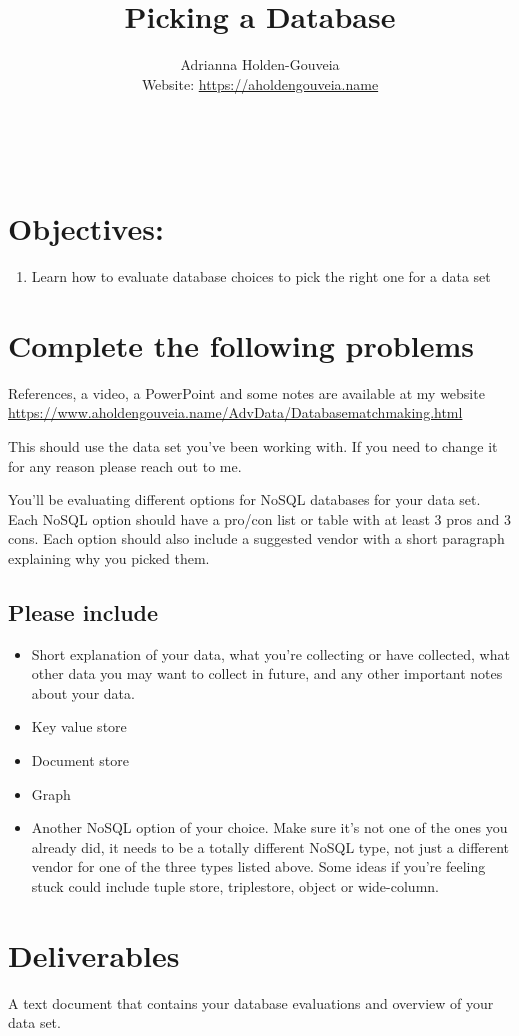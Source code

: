 \documentclass[12pt]{article}
\title{Picking a Database}
\author{
        Adrianna Holden-Gouveia \\
        Website: \url{https://aholdengouveia.name}\\ 
        \date{\vspace{-5ex}}
        \faLinkedin{: aholdengouveia} \\
        \faGithub {: aholdengouveia} \\
        }
\begin{document}
    

\maketitle


\section*{Objectives:}
\begin{enumerate}
    \item Learn how to evaluate database choices to pick the right one for a data set
\end{enumerate}
\section*{Complete the following problems}

References, a video, a PowerPoint and some notes are available at my website
\url {https://www.aholdengouveia.name/AdvData/Databasematchmaking.html}

This should use the data set you've been working with.  If you need to change it for any reason please reach out to me.

You'll be evaluating different options for NoSQL databases for your data set. Each NoSQL option should have a pro/con list or table with at least 3 pros and 3 cons. Each option should also include a suggested vendor with a short paragraph explaining why you picked them. 

\subsection*{Please include}
    \begin{itemize}
        \item Short explanation of your data, what you're collecting or have collected, what other data you may want to collect in future, and any other important notes about your data. 
        \item Key value store
        \item Document store
        \item Graph
        \item Another NoSQL option of your choice.  Make sure it's not one of the ones you already did, it needs to be a totally different NoSQL type, not just a different vendor for one of the three types listed above. Some ideas if you're feeling stuck could include tuple store, triplestore, object or wide-column.
    \end{itemize}



\section*{Deliverables}
A text document that contains your database evaluations and overview of your data set.
\end{document}
